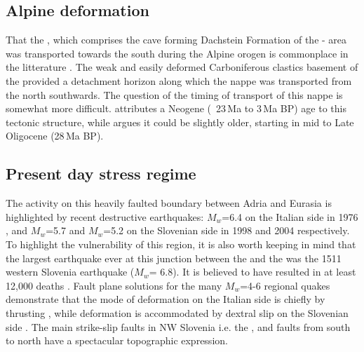  
\subsection{Alpine deformation}
\label{par:alpine deformation}
That the , which comprises the cave forming Dachstein Formation of the - area was transported towards the south during the Alpine orogen is commonplace in the litterature \citep{doglioni1987eoalpine,placer1998contribution}. 
The weak and easily deformed Carboniferous clastics basement of the  provided a detachment horizon along which the nappe was transported from the north southwards. The question of the timing of transport of this nappe is somewhat more difficult. \citet{buser1986tolmavc} attributes a Neogene (~23\,Ma to 3\,Ma BP) age to this tectonic structure, while \citet{placer1998contribution} argues it could be slightly older, starting in mid to Late Oligocene (28\,Ma BP).

\subsection{Present day stress regime}
\label{par:present day stress regime}
The activity on this heavily faulted boundary between Adria and Eurasia is highlighted by recent destructive earthquakes: $M_w$=6.4 on the Italian side in 1976 \citep{pondrelli2001seismotectonic}, and $M_w$=5.7 and $M_w$=5.2 on the Slovenian side in 1998 \citep{bajc20011998} and 2004 \citep{aoudia2005july} respectively. 
To highlight the vulnerability of this region, it is also worth keeping in mind that the largest earthquake ever at this junction between the  and the  was the 1511 western Slovenia earthquake ($M_w$= 6.8). It is believed to have resulted in at least 12,000 deaths \citep{fitzko2005constraints}.
Fault plane solutions for the many $M_w$=4-6 regional quakes demonstrate that the mode of deformation on the Italian side is chiefly by thrusting \citep{poli2002new}, while deformation is accommodated by dextral slip on the Slovenian side \citep{poljak2000seismotectonic}. 
The main strike-slip faults in NW Slovenia i.e. the ,  and  faults from south to north have a spectacular topographic expression. 

